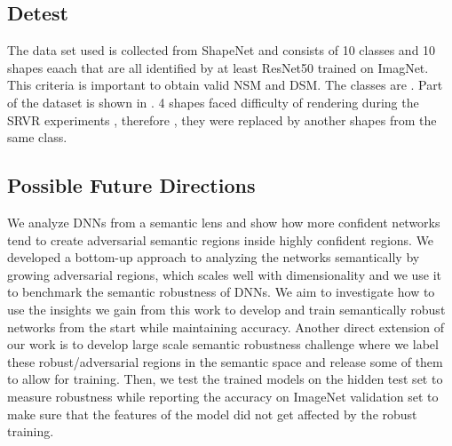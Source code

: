 \subsection{Detest}
The data set used is collected from ShapeNet \cite{shapenet} and consists of 10 classes and 10 shapes eaach that are all identified by at least ResNet50 trained on ImagNet. This criteria is important to obtain valid NSM and DSM. The classes are . Part of the dataset is shown in \figLabel{\ref{fig:conv1},\ref{fig:conv2}}. 4 shapes faced difficulty of rendering during the SRVR experiments , therefore , they were replaced by another shapes from the same class.



\subsection{Possible Future Directions}
We analyze DNNs from a semantic lens and show how more confident networks tend to create adversarial semantic regions inside highly confident regions. We developed a bottom-up approach to analyzing the networks semantically by growing adversarial regions, which scales well with dimensionality and we use it to benchmark the semantic robustness of DNNs. We aim to investigate how to use the insights we gain from this work to develop and train semantically robust networks from the start while maintaining accuracy. Another direct extension of our work is to develop large scale semantic robustness challenge where we label these robust/adversarial regions in the semantic space and release some of them to allow for training. Then, we test the trained models on the hidden test set to measure robustness while reporting the accuracy on ImageNet validation set to make sure that the features of the model did not get affected by the robust training.

